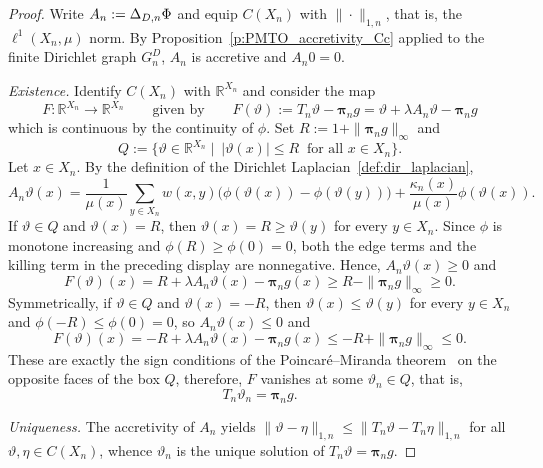 \documentclass[letterpaper]{article}
\theoremstyle{definition}
\theoremstyle{named}
\numberwithin{equation}{section}
\newcommand{\Deltadir}[1][]{\Delta_{D\ifx&#1&\else,#1\fi}}
\begin{document}
\begin{proof}
{
Write $A_n:=\Deltadir[n]\Phi$ and equip $C(X_n)$ with $\|\cdot\|_{1,n}$, that is, the $\ell^1(X_n,\mu)$ norm. By
Proposition~\ref{p:PMTO_accretivity_Cc} applied to the finite Dirichlet graph
$G_n^{D}$,
$A_n$ is accretive and $A_n0=0$.

\emph{Existence.} Identify $C(X_n)$ with $\mathbb R^{X_n}$ and consider the map
\[
 F\colon\mathbb R^{X_n}\to\mathbb R^{X_n}
 \qquad  \text{given by} \qquad 
 F(\vartheta):=T_n\vartheta-\boldsymbol{\pi}_ng
 =\vartheta+\lambda A_n\vartheta-\boldsymbol{\pi}_ng
\]
which is continuous by the continuity of $\phi$. Set
$R:=1+\|\boldsymbol{\pi}_ng\|_\infty$ and
\[
 Q:=\bigl\{\vartheta\in\mathbb R^{X_n} \mid \ |\vartheta(x)|\leq R\ \text{ for all } x\in X_n\bigr\}.
\]
Let $x\in X_n$. By the definition of the Dirichlet
Laplacian~\eqref{def:dir_laplacian},
\[
 A_n\vartheta(x)
 =\frac{1}{\mu(x)}\sum_{y\in X_n}w(x,y)
 \bigl(\phi(\vartheta(x))-\phi(\vartheta(y))\bigr)
 +\frac{\kappa_n(x)}{\mu(x)}\phi(\vartheta(x)).
\]
If $\vartheta\in Q$ and $\vartheta(x)=R$, then
$\vartheta(x)=R\geq\vartheta(y)$ for every $y\in X_n$. Since $\phi$ is
monotone increasing and $\phi(R)\geq\phi(0)=0$, both the edge terms and
the killing term in the preceding display are nonnegative.
Hence,
$A_n\vartheta(x)\geq 0$ and
\[
 F(\vartheta)(x)=R+\lambda A_n\vartheta(x)-\boldsymbol{\pi}_ng(x)
 \geq R-\|\boldsymbol{\pi}_ng\|_\infty\geq 0 .
\]
Symmetrically, if $\vartheta\in Q$ and $\vartheta(x)=-R$, then
$\vartheta(x)\leq\vartheta(y)$ for every $y\in X_n$ and
$\phi(-R)\leq\phi(0)=0$, so
$A_n\vartheta(x)\leq 0$ and
\[
 F(\vartheta)(x)=-R+\lambda A_n\vartheta(x)-\boldsymbol{\pi}_ng(x)
 \leq -R+\|\boldsymbol{\pi}_ng\|_\infty\leq 0 .
\]
These are exactly the sign conditions of the Poincaré--Miranda theorem~\cite{Mawhin2013} on the
opposite faces of the box $Q$, therefore, $F$ vanishes at some
$\vartheta_n\in Q$, that is,
\[
 T_n\vartheta_n=\boldsymbol{\pi}_ng .
\]

\emph{Uniqueness.} The accretivity of $A_n$ yields
$\|\vartheta-\eta\|_{1,n}\leq\|T_n\vartheta-T_n\eta\|_{1,n}$ for all
$\vartheta,\eta\in C(X_n)$, whence $\vartheta_n$ is the unique solution of
$T_n\vartheta=\boldsymbol{\pi}_ng$.
}


\end{proof}
\end{document}
